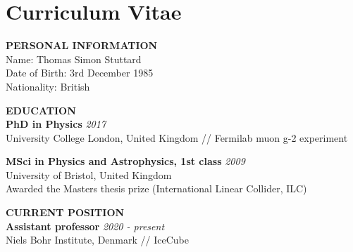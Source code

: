 \documentclass[a4paper,11pt]{article}
\renewcommand{\smallskip} {\vspace{0.1in}}
\begin{document}
\section{Curriculum Vitae}


\vspace{0.2cm}
\textbf{PERSONAL INFORMATION ~~\hrulefill}\smallskip\\
Name: Thomas Simon Stuttard \\
Date of Birth: 3rd December 1985\\
Nationality: British

%
\vspace{0.2cm}
\textbf{EDUCATION ~~\hrulefill}\smallskip\\
%
{\bf PhD in Physics} \hfill {\em 2017} \\ 
University College London, United Kingdom // Fermilab muon g-2 experiment

{\bf MSci in Physics and Astrophysics, 1st class} \hfill {\em 2009} \\ 
University of Bristol, United Kingdom \\
Awarded the Masters thesis prize (International Linear Collider, ILC)

%
%
\vspace{0.2cm}
\textbf{CURRENT POSITION ~~\hrulefill}\smallskip\\
%
{\bf Assistant professor} \hfill {\em 2020 - present} \\ 
Niels Bohr Institute, Denmark // IceCube
\end{document}
